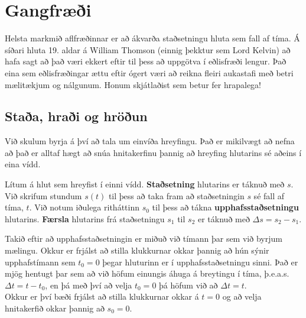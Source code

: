 \ifdefined \wholebook \else\documentclass[oneside]{book}\usepackage{EdlBook}\graphicspath{{figures/}}
\begin{document}
%
\setcounter{chapter}{2} %
%
\fi

\renewcommand{\thefigure}{\arabic{figure}}


\chapter{Gangfræði}

Helsta markmið aflfræðinnar er að ákvarða staðsetningu hluta sem fall af tíma. Á síðari hluta 19. aldar á William Thomson (einnig þekktur sem Lord Kelvin) að hafa sagt að það væri ekkert eftir til þess að uppgötva í eðlisfræði lengur. Það eina sem eðlisfræðingar ættu eftir ógert væri að reikna fleiri aukastafi með betri mælitækjum og nálgunum. Honum skjátlaðist sem betur fer hrapalega!

\section{Staða, hraði og hröðun}

Við skulum byrja á því að tala um einvíða hreyfingu. Það er mikilvægt að nefna að það er alltaf hægt að snúa hnitakerfinu þannig að hreyfing hlutarins sé aðeins í eina vídd. 

\begin{tcolorbox}
\begin{definition}
    Lítum á hlut sem hreyfist í einni vídd. \textbf{Staðsetning} hlutarins er táknuð með $s$. Við skrifum stundum $s(t)$ til þess að taka fram að staðsetningin $s$ sé fall af tíma, $t$. Við notum iðulega ritháttinn $s_0$ til þess að tákna \textbf{upphafsstaðsetningu} hlutarins. \textbf{Færsla} hlutarins frá staðsetningu $s_1$ til $s_2$ er táknuð með $\Delta s = s_2 - s_1$. 
\end{definition}
\end{tcolorbox}
Takið eftir að upphafsstaðsetningin er miðuð við tímann þar sem við byrjum mælingu. Okkur er frjálst að stilla klukkurnar okkar þannig að hún sýnir upphafstímann sem $t_0 = 0$ þegar hluturinn er í upphafsstaðsetningu sinni. Það er mjög hentugt þar sem að við höfum einungis áhuga á breytingu í tíma, þ.e.a.s.~$\Delta t = t - t_0$, en þá með því að velja $t_0 = 0$ þá höfum við að $\Delta t = t$. \\

Okkur er því bæði frjálst að stilla klukkurnar okkar á $t = 0$ og að velja hnitakerfið okkar þannig að $s_0 = 0$.\\
\end{document}
